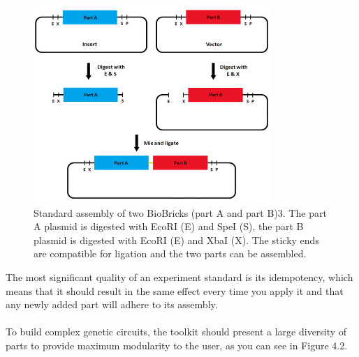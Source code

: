 \begin{figure}[!htbp]
    \centering
    \includegraphics[width=0.8\textwidth]{images/chap4/chap4_asm_01.png}
    \caption{Standard assembly of two BioBricks (part A and part B)3. The part A plasmid is digested with EcoRI (E) and SpeI (S), the part B plasmid is digested with EcoRI (E) and XbaI (X). The sticky ends are compatible for ligation and the two parts can be assembled.}
    \label{fig:ch4asm01}
\end{figure}
\FloatBarrier
\noindent
The most significant quality of an experiment standard is its idempotency, which means that it should result in the same effect every time you apply it and that any newly added part will adhere to its assembly. \\ \\
To build complex genetic circuits, the toolkit should present a large diversity of parts to provide maximum modularity to the user, as you can see in Figure 4.2. 

